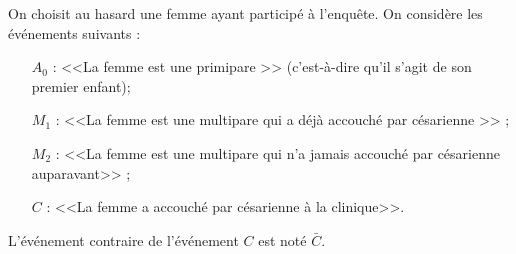 On choisit au hasard une femme ayant participé à l'enquête.
On considère les événements suivants :
\begin{itemize}
	\item[$A_0$ :]  <<La femme est une primipare >> (c'est-à-dire qu'il s'agit de son premier enfant);
	\item[$M_1$ :]  <<La femme est une multipare qui a déjà accouché par césarienne >> ;
	\item[$M_2$ :]  <<La femme est une multipare qui n'a jamais accouché par césarienne auparavant>> ;
	\item[$C$ :] <<La femme a accouché par césarienne à la clinique>>.
\end{itemize}

L'événement contraire de l'événement $C$ est noté $\bar{C}$.

